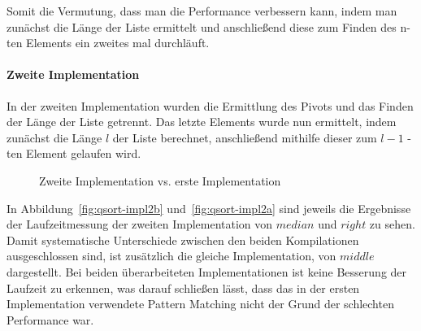 Somit die Vermutung, dass man die Performance verbessern kann, indem man
zunächst die Länge der Liste ermittelt und anschließend diese zum Finden des
n-ten Elements ein zweites mal durchläuft.

\paragraph{Zweite Implementation}

In der zweiten Implementation wurden die Ermittlung des Pivots und das Finden
der Länge der Liste getrennt.
Das letzte Elements wurde nun ermittelt, indem zunächst
die Länge \(l\) der Liste berechnet, anschließend mithilfe dieser zum
\(l-1\) -ten Element gelaufen wird.
\begin{figure}[hbt]
    \centering
    \caption{Zweite Implementation vs. erste Implementation}
    \hfill
\end{figure}


In Abbildung~\ref{fig:qsort-impl2b} und~\ref{fig:qsort-impl2a} sind jeweils die
Ergebnisse der Laufzeitmessung der zweiten Implementation von \(median\) und
\(right\) zu sehen.
Damit systematische Unterschiede zwischen den beiden Kompilationen
ausgeschlossen sind, ist zusätzlich die gleiche Implementation, von \(middle\)
dargestellt.
Bei beiden überarbeiteten Implementationen ist keine Besserung der Laufzeit zu
erkennen, was darauf schließen lässt, dass das in der ersten Implementation
verwendete Pattern Matching nicht der Grund der schlechten Performance war.

